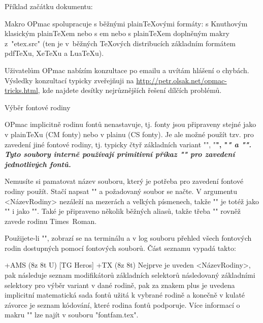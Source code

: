Příklad začátku dokumentu:

\begtt
\chyph              %
\fontfam [LM fonts] %
\typosize[12/14]    %
\endtt

Makro OPmac spolupracuje s běžnými plain\TeX{}ovými formáty: s Knuthovým
klasickým \hbox{plain}\TeX{}em nebo s \csplain{}em nebo s plain\TeX{}em
doplněným makry z~"etex.src" (ten je v~běžných \TeX{}ových distribucích 
základním formátem pdf\TeX{}u, Xe\TeX{}u a Lua\TeX{}u). 

Uživatelům OPmac nabízím konzultace po emailu a uvítám hlášení o chybách.
Výsledky konzultací typicky zveřejňuji na
\url{http://petr.olsak.net/opmac-tricks.html}, kde najdete desítky
nejrůznějších řešení dílčích problémů.


\sec Výběr fontové rodiny

OPmac implicitně rodinu fontů nenastavuje, tj. fonty jsou připraveny stejné
jako v plainTeXu (CM fonty) nebo v \CS{}plainu (CS fonty). Je ale možné 
použít tzv.  pro zavedení jiné fontové rodiny, tj.
typicky čtyř základních variant "\rm", "\bf", "\it" a "\bi". Tyto soubory
interně používají primitivní příkaz "\font" pro zavedení jednotlivých fontů.

Nemusíte si pamatovat název souboru, který je potřeba pro zavedení fontové
rodiny použít. Stačí napsat "\fontfam[<NázevRodiny>]" a požadovaný
soubor se načte. V argumentu <NázevRodiny> nezáleží na mezerách a velkých
písmenech, takže "" je totéž jako
"\fontfam[TimesRoman]" i jako "\fontfam[timesroman]". Také je připraveno
několik běžných aliasů, takže třeba "\fontfam[times]" rovněž zavede rodinu
Times~Roman.

Použijete-li "\fontfam[?]", zobrazí se na terminálu a v log souboru přehled
všech fontových rodin dostupných pomocí fontových souborů. Část seznamu vypadá
takto:

 {\rm \bf \it \bi } +AMS (8z 8t U)
[TG Heros]  {\caps \cond } {\rm \bf \it \bi } +TX (8z 8t)
\endtt
%
Nejprve je uveden <NázevRodiny>, pak následuje seznam modifikátorů
základních selektorů následovaný základními selektory pro výběr variant v
dané rodině, pak za znakem plus je uvedena implicitní matematická sada fontů
užitá k vybrané rodině a konečně v kulaté závorce je seznam kódování, které
rodina fontů podporuje. Více informací o makru "\fontfam" lze najít v
souboru "fontfam.tex".

